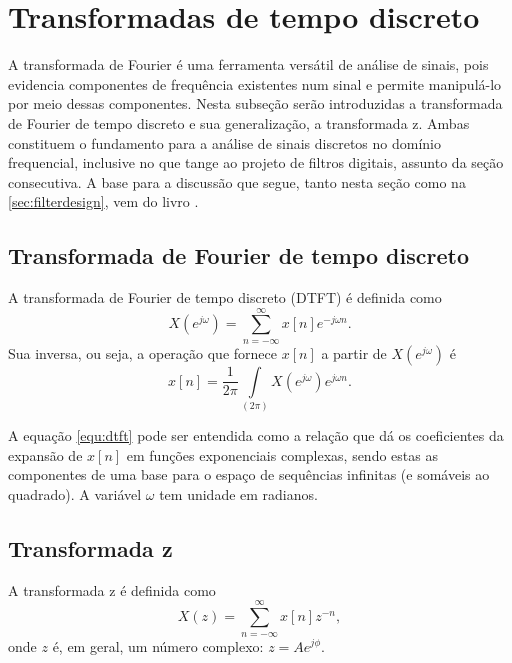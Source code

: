 \section{Transformadas de tempo discreto}

A transformada de Fourier é uma ferramenta versátil de análise de sinais, pois evidencia componentes de frequência existentes num sinal e permite manipulá-lo por meio dessas componentes. Nesta subseção serão introduzidas a transformada de Fourier de tempo discreto e sua generalização, a transformada z. Ambas constituem o fundamento para a análise de sinais discretos no domínio frequencial, inclusive no que tange ao projeto de filtros digitais, assunto da seção consecutiva. A base para a discussão que segue, tanto nesta seção como na \ref{sec:filterdesign}, vem do livro \cite{Oppenheim2009}.

\subsection*{Transformada de Fourier de tempo discreto}
A transformada de Fourier de tempo discreto (DTFT) é definida como
\begin{equation}
     X(e^{j\omega}) = \sum_{n=-\infty}^{\infty} x[n]e^{-j\omega n}.
     \label{equ:dtft}
\end{equation}
Sua inversa, ou seja, a operação que fornece $x[n]$ a partir de $X(e^{j\omega})$ é
\begin{equation}
     x[n] = \frac{1}{2\pi}\int\limits_{(2\pi)} X(e^{j\omega})e^{j\omega n}.
\end{equation}

A equação \ref{equ:dtft} pode ser entendida como a relação que dá os coeficientes da expansão de $x[n]$ em funções exponenciais complexas, sendo estas as componentes de uma base para o espaço de sequências infinitas (e somáveis ao quadrado). A variável $\omega$ tem unidade em radianos.

\subsection*{Transformada z}

A transformada z é definida como
\begin{equation}
     X(z) = \sum_{n=-\infty}^{\infty} x[n]z^{-n},
\end{equation}
onde $z$ é, em geral, um número complexo: $z=Ae^{j\phi}$.


